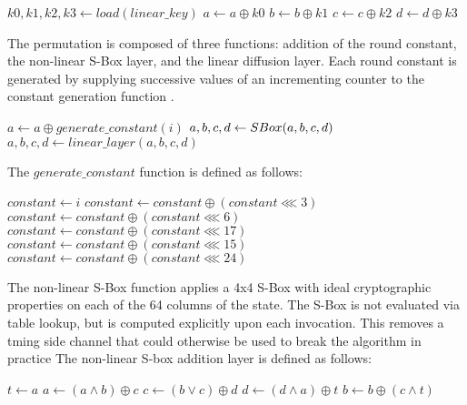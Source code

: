 \documentclass[preprint]{iacrtrans}
\begin{document}
\begin{algorithmic}
	\State $k0, k1, k2, k3 \gets load(linear\_key)$ %
	\State $a \gets a \oplus k0$
	\State $b \gets b \oplus k1$
	\State $c \gets c \oplus k2$
	\State $d \gets d \oplus k3$
\EndFunction
\end{algorithmic}



The permutation is composed of three functions: addition of the round constant, the non-linear S-Box layer, and the linear diffusion layer. Each round constant is generated by supplying successive values of an incrementing counter to the constant generation function .

\begin{algorithmic}
	\State $a \gets a \oplus generate\_constant(i)$
	\State $a, b, c, d \gets S\-Box(a, b, c, d)$
	\State $a, b, c, d \gets linear\_layer(a, b, c, d)$
\EndFunction\\
\end{algorithmic}

The $generate\_constant$ function is defined as follows: \\

\begin{algorithmic}
	\State $constant \gets i$
	\State $constant \gets constant \oplus (constant \lll 3)$
	\State $constant \gets constant \oplus (constant \lll 6)$
	\State $constant \gets constant \oplus (constant \lll 17)$
	\State $constant \gets constant \oplus (constant \lll 15)$
	\State $constant \gets constant \oplus (constant \lll 24)$	
\EndFunction\\
\end{algorithmic}

The non-linear S-Box function applies a 4x4 S-Box with ideal cryptographic properties on each of the 64 columns of the state. The S-Box is not evaluated via table lookup, but is computed explicitly upon each invocation. This removes a tming side channel that could otherwise be used to break the algorithm in practice The non-linear S-box addition layer is defined as follows: \\

\begin{algorithmic}
	\State $t \gets a$
	\State $a \gets (a \land b) \oplus c$
	\State $c \gets (b \lor c) \oplus d$
	\State $d \gets (d \land a) \oplus t$
	\State $b \gets b \oplus (c \land t)$
\EndFunction\\
\end{algorithmic}
\end{document}
